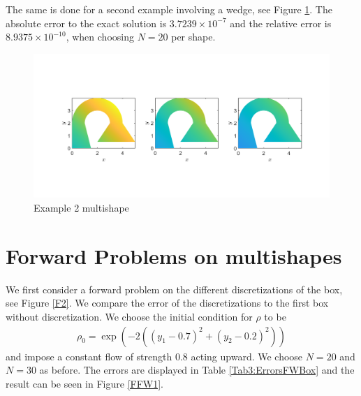 \documentclass[11pt, a4paper]{article}
\theoremstyle{definition}
\begin{document}
The same is done for a second example involving a wedge, see Figure \ref{F7}. The absolute error to the exact solution is $3.7239 \times 10^{-7}$ and the relative error is $8.9375 \times 10^{-10}$, when choosing $N= 20$ per shape. 

\begin{figure}[h]
	\centering
	\includegraphics[scale=0.35]{example2.png}
	\caption{Example 2 multishape} 
	\label{F7}
\end{figure}


\section{Forward Problems on multishapes}
We first consider a forward problem on the different discretizations of the box, see Figure \ref{F2}. We compare the error of the discretizations to the first box without discretization.
We choose the initial condition for $\rho$ to be
\begin{align*}
	\rho_0 = \exp(-2((y_1 - 0.7 )^2 + (y_2 - 0.2)^2))
\end{align*}
and impose a constant flow of strength $0.8$ acting upward.
We choose $N = 20$ and $N = 30$ as before. The errors are displayed in Table \ref{Tab3:ErrorsFWBox} and the result can be seen in Figure \ref{FFW1}. 
\end{document}
